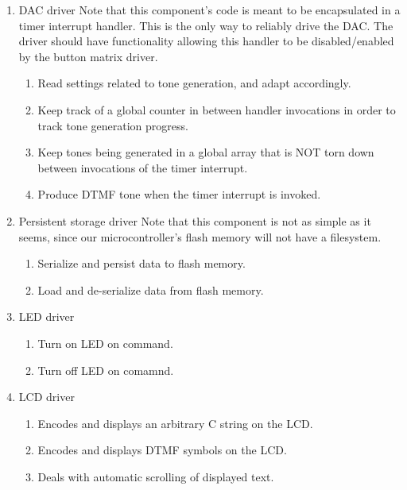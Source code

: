 \documentclass[11pt,a4paper
]{scrartcl}
\begin{document}
\begin{enumerate}
   \item DAC driver
      Note that this component's code is meant to be encapsulated in a timer interrupt handler.
      This is the only way to reliably drive the DAC.
      The driver should have functionality allowing this handler to be disabled/enabled by the button matrix driver.
      \begin{enumerate}
         \item Read settings related to tone generation, and adapt accordingly.
         \item Keep track of a global counter in between handler invocations in order to track tone generation progress.
         \item Keep tones being generated in a global array that is NOT torn down between invocations of the timer interrupt.
         \item Produce DTMF tone when the timer interrupt is invoked.
      \end{enumerate}

   \item Persistent storage driver
      Note that this component is not as simple as it seems, since our microcontroller's flash memory will not have a filesystem.
      \begin{enumerate}
         \item Serialize and persist data to flash memory.
         \item Load and de-serialize data from flash memory.
      \end{enumerate}
   
   \item LED driver
      \begin{enumerate}
         \item Turn on LED on command.
         \item Turn off LED on comamnd.
      \end{enumerate}

   \item LCD driver
      \begin{enumerate}
         \item Encodes and displays an arbitrary C string on the LCD.
         \item Encodes and displays DTMF symbols on the LCD.
         \item Deals with automatic scrolling of displayed text.
      \end{enumerate}
\end{enumerate}
\end{document}
